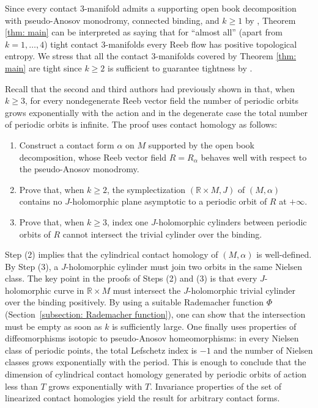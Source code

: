 \documentclass[10pt]{amsart}
\theoremstyle{plain}
\theoremstyle{definition}
\numberwithin{equation}{subsection}
\newcommand{\RR}{\mathbb{R}}
\begin{document}
Since every contact $3$-manifold admits a supporting open book decomposition with pseudo-Anosov monodromy, connected binding, and $k\geq 1$ by \cite{CH1}, Theorem \ref{thm: main} can be interpreted as saying that for ``almost all'' (apart from $k=1,\dots,4$) tight contact $3$-manifolds every Reeb flow has positive topological entropy.
We stress that all the contact $3$-manifolds covered by Theorem \ref{thm: main} are tight since $k\geq 2$ is sufficient to guarantee tightness by \cite[Th.\,2.3]{CH2}.

Recall that the second and third authors had previously shown in \cite[Th.\,2.3 and Corollary 2.6]{CH2} that, when $k\geq 3$, for every nondegenerate Reeb vector field the number of periodic orbits grows exponentially with the action and in the degenerate case the total number of periodic orbits is infinite. The proof uses contact homology as follows:
\begin{enumerate}
\item Construct a contact form $\alpha$ on $M$ supported by the open book decomposition, whose Reeb vector field $R=R_\alpha$ behaves well with respect to the pseudo-Anosov monodromy.
\item Prove that, when $k\geq 2$, the symplectization $(\RR\times M, J)$ of $(M,\alpha)$ contains no $J$-holomorphic plane asymptotic to a periodic orbit of $R$ at $+\infty$.
\item Prove that, when $k\geq 3$, index one $J$-holomorphic cylinders between periodic orbits of $R$ cannot intersect the trivial cylinder over the binding.
\end{enumerate}

Step (2) implies that the cylindrical contact homology of $(M,\alpha)$ is well-defined. By Step (3), a $J$-holomorphic cylinder must join two orbits in the same Nielsen class. The key point in the proofs of Steps (2) and (3) is that every $J$-holomorphic curve in $\RR\times M$ must intersect the $J$-holomorphic trivial cylinder over the binding positively. By using a suitable Rademacher function $\Phi$ (\cf Section~\ref{subsection: Rademacher function}), one can show that the intersection must be empty as soon as $k$ is sufficiently large. One finally uses properties of diffeomorphisms isotopic to pseudo-Anosov homeomorphisms: in every Nielsen class of periodic points, the total Lefschetz index is $-1$ and the number of Nielsen classes grows exponentially with the period. This is enough to conclude that the dimension of cylindrical contact homology generated by periodic orbits of action less than $T$ grows exponentially with $T$. Invariance properties of the set of linearized contact homologies yield the result for arbitrary contact forms.
\end{document}
